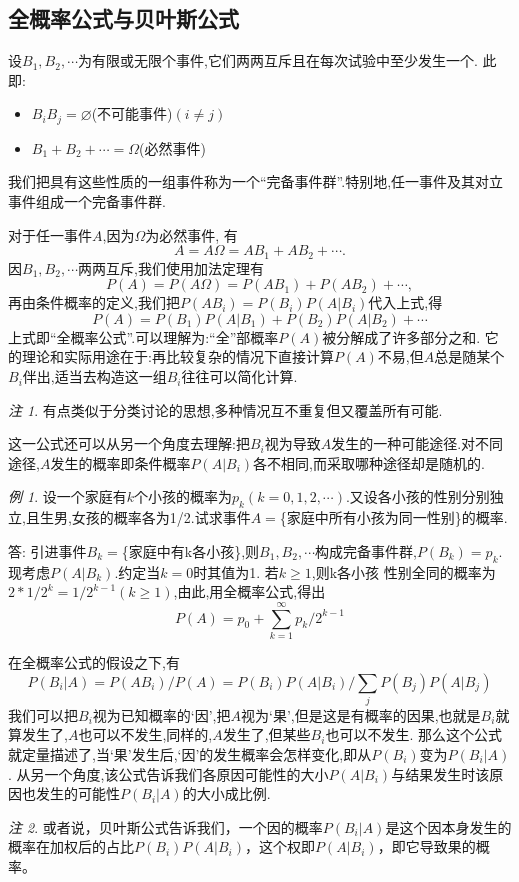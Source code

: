 \documentclass[a4paper,11pt]{article}%
\theoremstyle{remark}
\newtheorem*{remark}{注}
\theoremstyle{remark}
\newtheorem*{example}{例}
\theoremstyle{definition}
\theoremstyle{definition}
\theoremstyle{plain}
\begin{document}
\subsection{全概率公式与贝叶斯公式}
设$B_1,B_2,\cdots$为有限或无限个事件,它们两两互斥且在每次试验中至少发生一个.
此即:
\begin{itemize}
    \item$B_iB_j=\varnothing$(不可能事件)$(i\neq j)$
    \item$B_1+B_2+\cdots=\Omega$(必然事件)
\end{itemize}
我们把具有这些性质的一组事件称为一个``完备事件群''.特别地,任一事件及其对立事件组成一个完备事件群.

对于任一事件$A$,因为$\Omega$为必然事件, 有
\[A = A\Omega=AB_1+AB_2+\cdots.\]因$B_1,B_2,\cdots$两两互斥,我们使用加法定理有
\[P(A)=P(A\Omega)=P(AB_1)+P(AB_2)+\cdots,\]
再由条件概率的定义,我们把$P(AB_i)=P(B_i)P(A|B_i)$代入上式,得
\[P(A)=P(B_1)P(A|B_1)+P(B_2)P(A|B_2)+\cdots\]
上式即``全概率公式''.可以理解为:``全''部概率$P(A)$被分解成了许多部分之和.
它的理论和实际用途在于:再比较复杂的情况下直接计算$P(A)$不易,但$A$总是随某个$B_i$伴出,适当去构造这一组$B_i$往往可以简化计算.
\begin{remark}
    有点类似于分类讨论的思想,多种情况互不重复但又覆盖所有可能.
\end{remark}
这一公式还可以从另一个角度去理解:把$B_i$视为导致$A$发生的一种可能途径.对不同途径,$A$发生的概率即条件概率$P(A|B_i)$各不相同,而采取哪种途径却是随机的.
\begin{example}
    设一个家庭有$k$个小孩的概率为$p_k(k=0,1,2,\cdots)$.又设各小孩的性别分别独立,且生男,女孩的概率各为1/2.试求事件$A=$\{家庭中所有小孩为同一性别\}的概率.

    答:
    引进事件$B_k=$\{家庭中有k各小孩\},则$B_1,B_2,\cdots$构成完备事件群,$P(B_k)=p_k$.现考虑$P(A|B_k)$.约定当$k=0$时其值为1. 若$k\geq 1$,则k各小孩
    性别全同的概率为$2*1/2^k=1/2^{k-1}(k\geq 1)$,由此,用全概率公式,得出
    \[P(A)=p_0+\sum_{k=1}^{\infty}p_k/2^{k-1}\]
\end{example}
在全概率公式的假设之下,有
\[P(B_i|A)=P(AB_i)/P(A)=P(B_i)P(A|B_i)/\sum_jP(B_j)P(A|B_j)\]
我们可以把$B_i$视为已知概率的`因',把$A$视为`果',但是这是有概率的因果,也就是$B_i$就算发生了,$A$也可以不发生,同样的,$A$发生了,但某些$B_i$也可以不发生.
那么这个公式就定量描述了,当`果'发生后,`因'的发生概率会怎样变化,即从$P(B_i)$变为$P(B_i|A)$.
从另一个角度,该公式告诉我们各原因可能性的大小$P(A|B_i)$与结果发生时该原因也发生的可能性$P(B_i|A)$的大小成比例.
\begin{remark}
    或者说，贝叶斯公式告诉我们，一个因的概率$P(B_i|A)$是这个因本身发生的概率在加权后的占比$P(B_i)P(A|B_i)$，这个权即$P(A|B_i)$，即它导致果的概率。
\end{remark}
\end{document}

